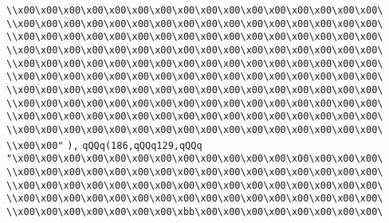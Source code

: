 \verb|\\x00\x00\x00\x00\x00\x00\x00\x00\x00\x00\x00\x00\x00\x00\x00\x00\|\newline
\verb|\\x00\x00\x00\x00\x00\x00\x00\x00\x00\x00\x00\x00\x00\x00\x00\x00\|\newline
\verb|\\x00\x00\x00\x00\x00\x00\x00\x00\x00\x00\x00\x00\x00\x00\x00\x00\|\newline
\verb|\\x00\x00\x00\x00\x00\x00\x00\x00\x00\x00\x00\x00\x00\x00\x00\x00\|\newline
\verb|\\x00\x00\x00\x00\x00\x00\x00\x00\x00\x00\x00\x00\x00\x00\x00\x00\|\newline
\verb|\\x00\x00\x00\x00\x00\x00\x00\x00\x00\x00\x00\x00\x00\x00\x00\x00\|\newline
\verb|\\x00\x00\x00\x00\x00\x00\x00\x00\x00\x00\x00\x00\x00\x00\x00\x00\|\newline
\verb|\\x00\x00\x00\x00\x00\x00\x00\x00\x00\x00\x00\x00\x00\x00\x00\x00\|\newline
\verb|\\x00\x00\x00\x00\x00\x00\x00\x00\x00\x00\x00\x00\x00\x00\x00\x00\|\newline
\verb|\\x00\x00\x00\x00\x00\x00\x00\x00\x00\x00\x00\x00\x00\x00\x00\x00\|\newline
\verb|\\x00\x00"|\newline
\verb|),|\newline
\verb|qQQq(186,qQQq129,qQQq|\newline
\verb|"\x00\x00\x00\x00\x00\x00\x00\x00\x00\x00\x00\x00\x00\x00\x00\x00\|\newline
\verb|\\x00\x00\x00\x00\x00\x00\x00\x00\x00\x00\x00\x00\x00\x00\x00\x00\|\newline
\verb|\\x00\x00\x00\x00\x00\x00\x00\x00\x00\x00\x00\x00\x00\x00\x00\x00\|\newline
\verb|\\x00\x00\x00\x00\x00\x00\x00\x00\x00\x00\x00\x00\x00\x00\x00\x00\|\newline
\verb|\\x00\x00\x00\x00\x00\x00\x00\xbb\x00\x00\x00\x00\x00\x00\x00\x00\|\newline
